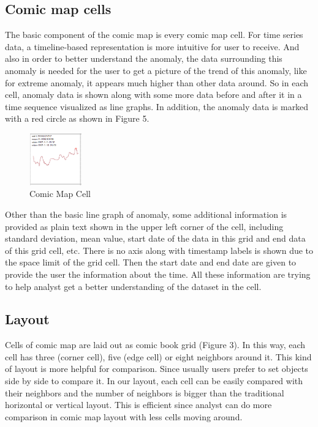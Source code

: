 \documentclass{vgtc}                          %
\begin{document}
\subsection{Comic map cells}

The basic component of the comic map is every comic map cell. For time series data, a timeline-based representation is more intuitive for user to receive. And also in order to better understand the anomaly, the data surrounding this anomaly is needed for the user to get a picture of the trend of this anomaly, like for extreme anomaly, it appears much higher than other data around. So in each cell, anomaly data is shown along with some more data before and after it in a time sequence visualized as line graphs. In addition, the anomaly data is marked with a red circle as shown in Figure 5. 

\begin{figure}[htb]
	\centering
	\includegraphics[width=0.20\textwidth]{onecell.jpg}
	\caption{Comic Map Cell}
\end{figure}

Other than the basic line graph of anomaly, some additional information is provided as plain text shown in the upper left corner of the cell, including standard deviation, mean value, start date of the data in this grid and end data of this grid cell, etc. There is no axis along with timestamp labels is shown due to the space limit of the grid cell. Then the start date and end date are given to provide the user the information about the time. All these information are trying to help analyst get a better understanding of the dataset in the cell.
\subsection{Layout}
Cells of comic map are laid out as comic book grid (Figure 3). In this way, each cell has three (corner cell), five (edge cell) or eight neighbors around it. This kind of layout is more helpful for comparison. Since usually users prefer to set objects side by side to compare it. In our layout, each cell can be easily compared with their neighbors and the number of neighbors is bigger than the traditional horizontal or vertical layout. This is efficient since analyst can do more comparison in comic map layout with less cells moving around.
\end{document}
